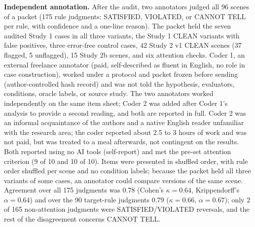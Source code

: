 \documentclass{ieeeaccess}
\begin{document}
\textbf{Independent annotation.} After the audit, two annotators judged all 96 scenes of a packet (175 rule judgments: SATISFIED, VIOLATED, or CANNOT TELL per rule, with confidence and a one-line reason). The packet held the seven audited Study 1 cases in all three variants, the Study 1 CLEAN variants with false positives, three error-free control cases, 42 Study 2 v1 CLEAN scenes (37 flagged, 5 unflagged), 15 Study 2b scenes, and six attention checks. Coder 1, an external freelance annotator (paid, self-described as fluent in English, no role in case construction), worked under a protocol and packet frozen before sending (author-controlled hash record) and was not told the hypothesis, evaluators, conditions, oracle labels, or source study. The two annotators worked independently on the same item sheet; Coder 2 was added after Coder 1's analysis to provide a second reading, and both are reported in full. Coder 2 was an informal acquaintance of the authors and a native English reader unfamiliar with the research area; the coder reported about 2.5 to 3 hours of work and was not paid, but was treated to a meal afterwards, not contingent on the results. Both reported using no AI tools (self-report) and met the pre-set attention criterion (9 of 10 and 10 of 10). Items were presented in shuffled order, with rule order shuffled per scene and no condition labels; because the packet held all three variants of some cases, an annotator could compare versions of the same scene. Agreement over all 175 judgments was 0.78 (Cohen's $\kappa=0.64$, Krippendorff's $\alpha=0.64$) and over the 90 target-rule judgments 0.79 ($\kappa=0.66$, $\alpha=0.67$); only 2 of 165 non-attention judgments were SATISFIED/VIOLATED reversals, and the rest of the disagreement concerns CANNOT TELL.
\end{document}
